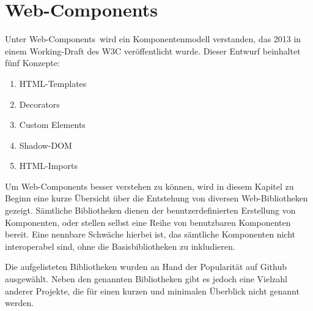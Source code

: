 \section{Web-Components}
\label{sec:3_W3C}

Unter \glqq Web-Components\grqq\ wird ein Komponentenmodell verstanden, das 2013 in einem Working-Draft des W3C veröffentlicht wurde. Dieser Entwurf beinhaltet fünf Konzepte:
\begin{enumerate}
\item HTML-Templates
\item Decorators
\item Custom Elements
\item Shadow-DOM
\item HTML-Imports
\end{enumerate}

Um Web-Components besser verstehen zu können, wird in diesem Kapitel zu Beginn eine kurze Übersicht über die Entstehung von diversen Web-Bibliotheken gezeigt. Sämtliche Bibliotheken dienen der benutzerdefinierten Erstellung von Komponenten, oder stellen selbst eine Reihe von benutzbaren Komponenten bereit. Eine nennbare Schwäche hierbei ist, das sämtliche Komponenten nicht interoperabel sind, ohne die Basisbibliotheken zu inkludieren.

Die aufgelisteten Bibliotheken wurden an Hand der Popularität auf Github ausgewählt. Neben den genannten Bibliotheken gibt es jedoch eine Vielzahl anderer Projekte, die für einen kurzen und minimalen Überblick nicht genannt werden.

